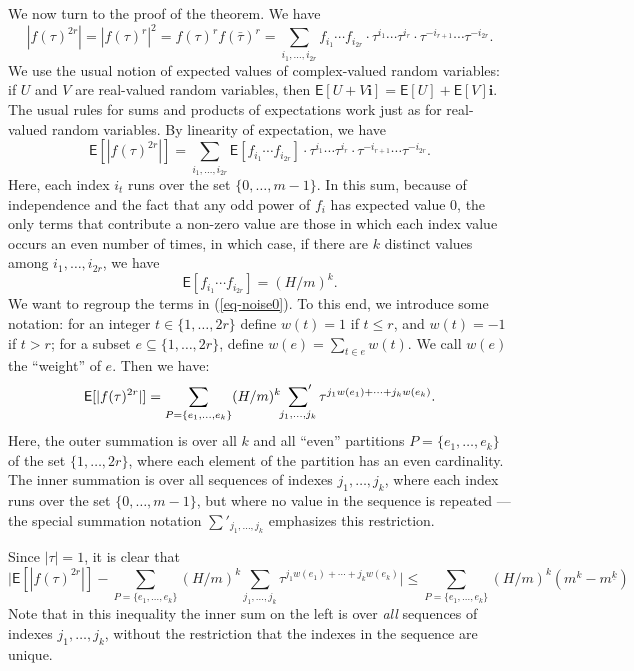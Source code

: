 \documentclass[14pt]{extarticle}
\def\EXP{\mathsf{E}}
\begin{document}
We now turn to the proof of the theorem.
We have
\[
|f(\tau)^{2r}| = |f(\tau)^r|^2 = f(\tau)^r f(\bar\tau)^r = 
\sum_{i_1,\ldots,i_{2r}} f_{i_1} \cdots f_{i_{2r}} \cdot 
  \tau^{i_1} \cdots \tau^{i_r} \cdot \tau^{-i_{r+1}} \cdots \tau^{-i_{2r}} . 
\]
We use the usual notion of expected values of complex-valued
random variables: if $U$ and $V$ are real-valued random variables,
then $\EXP[U + V\mathbf{i}] = \EXP[U] + \EXP[V] \mathbf{i}$.
The usual rules for sums and products of expectations work just as
for real-valued random variables.
By linearity of expectation, we have
\begin{equation}
\label{eq-noise0}
\EXP[|f(\tau)^{2r}|] = 
\sum_{i_1,\ldots,i_{2r}} \EXP[f_{i_1} \cdots f_{i_{2r}}] \cdot 
  \tau^{i_1} \cdots \tau^{i_r} \cdot \tau^{-i_{r+1}} \cdots \tau^{-i_{2r}} . 
\end{equation}
Here, each index $i_t$ runs over the set $\{0, \ldots, m-1\}$.
In this sum, because of independence and the fact that any odd power
of $f_i$ has expected value $0$, 
the only terms that contribute
a non-zero value are those in which each index value occurs
an even number of times,
in which case, if there are $k$ distinct values
among $i_1, \ldots, i_{2r}$,
we have
\[
\EXP[f_{i_1} \cdots f_{i_{2r}}] = (H/m)^k.
\]
We want to regroup the terms in (\ref{eq-noise0}).
To this end,
we introduce some notation:
for an integer $t \in \{ 1, \ldots, 2 r\}$
define  $w(t) = 1$ if $t \le r$, and $w(t) = -1$ if $t > r$;
for a subset $e \subseteq \{1, \ldots, 2 r\}$, define
$w(e) = \sum_{t \in e} w(t)$.
We call $w(e)$ the ``weight'' of $e$.
Then we have:
\begin{equation}
\label{eq-noise1}
\EXP[|f(\tau)^{2r}|] = \sum_{P = \{e_1, \ldots, e_k\}} (H/m)^k 
   \sideset{}{'}\sum_{j_1, \ldots, j_k} \tau^{j_1 w(e_1) + \cdots + j_k w(e_k)} .
\end{equation}
Here, the outer summation is over all $k$ and all ``even'' partitions 
$P = \{e_1, \ldots, e_k\}$ of the set $\{1, \ldots, 2r\}$,
where each element of the partition has an even cardinality.
The inner summation is over all sequences
of indexes $j_1, \ldots, j_k$,
where each index runs over the set $\{0, \ldots, m-1\}$,
but where no value in the sequence is repeated --- the special 
summation notation 
$\sum'_{j_1, \ldots, j_k}$
emphasizes this restriction.

Since $|\tau| = 1$, it is clear that
\begin{equation}
\label{eq-noise2}
\biggl| \EXP[|f(\tau)^{2r}|] - \sum_{P = \{e_1, \ldots, e_k\}} (H/m)^k 
   \sum_{j_1, \ldots, j_k} \tau^{j_1 w(e_1) + \cdots + j_k w(e_k)}  \biggr|
\le \sum_{P = \{e_1, \ldots, e_k\}} (H/m)^k (m^k - m^{\underline{k}})
\end{equation}
Note that in this inequality the inner sum on the left
 is over {\em all} sequences of indexes $j_1, \ldots, j_k$,
without the restriction that the indexes in the sequence
are unique.
\end{document}
